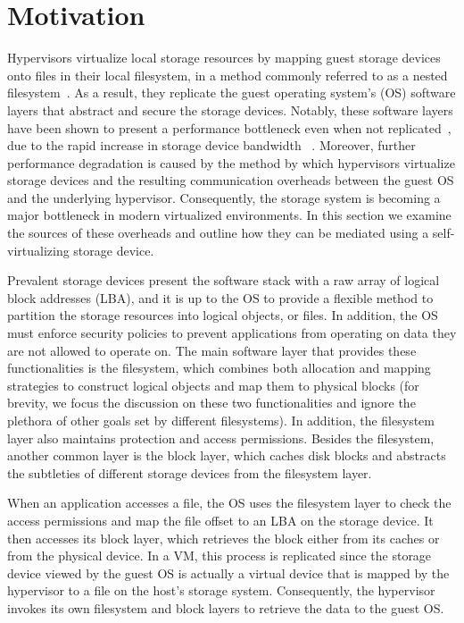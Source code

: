 
\chapter{Motivation}
\label{chap:motivation}


Hypervisors virtualize local storage resources by mapping guest storage devices onto files in their local filesystem, in a method commonly referred to as a nested filesystem~\cite{le12nested}. As a result, they replicate the guest operating system's (OS) software layers that abstract and secure the storage devices. Notably, these software layers have been shown to present a performance bottleneck even when not replicated~\cite{yu14swoverheads}, due to the rapid increase in storage device bandwidth ~\cite{intel-ssd,seagate16ssd}.
%
Moreover, further performance degradation is caused by the method by which hypervisors virtualize storage devices and the resulting communication overheads between the guest OS and the underlying hypervisor.
Consequently, the storage system is becoming a major bottleneck in modern virtualized environments.
%
In this section we examine the sources of these overheads and outline how they can be mediated using a self-virtualizing storage device.

Prevalent storage devices present the software stack with a raw array of logical block addresses (LBA), and it is up to the OS to provide a flexible method to partition the storage resources into logical objects, or files. In addition, the OS must enforce security policies to prevent applications from operating on data they are not allowed to operate on.
%
The main software layer that provides these functionalities is the filesystem, which combines both allocation and mapping strategies to construct logical objects and map them to physical blocks (for brevity, we focus the discussion on these two functionalities and ignore the plethora of other goals set by different filesystems). In addition, the filesystem layer also maintains protection and access permissions. Besides the filesystem, another common layer is the block layer, which caches disk blocks and abstracts the subtleties of different storage devices from the filesystem layer.

When an application accesses a file, the OS uses the filesystem layer to check the access permissions and map the file offset to an LBA on the storage device. It then accesses its block layer, which retrieves the block either from its caches or from the physical device. In a VM, this process is replicated since the storage device viewed by the guest OS is actually a virtual device that is mapped by the hypervisor to a file on the host's storage system. Consequently, the hypervisor invokes its own filesystem and block layers to retrieve the data to the guest OS. 


